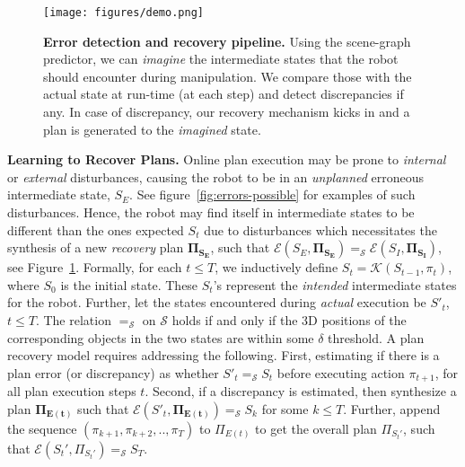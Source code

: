 \begin{figure}
         \centering     \texttt{[image: figures/demo.png]}
    \caption{
            \textbf{Error detection and recovery pipeline.}
             Using the scene-graph predictor, we can \textit{imagine} the intermediate states that the robot should encounter during manipulation. We compare those with the actual state at run-time (at each step) and detect discrepancies if any. In case of discrepancy, our recovery mechanism kicks in and a plan is generated to the \textit{imagined} state. 
    }
    \label{fig:rollout}
\end{figure}

\textbf{Learning to Recover Plans. }
%
Online plan execution may be prone to \emph{internal} or \emph{external} disturbances, causing the robot to be in an \emph{unplanned} erroneous intermediate state, $S_E$. See figure~\ref{fig:errors-possible} for examples of such disturbances.  Hence, the robot may find itself in intermediate states to be different than the ones expected $S_t$ due to disturbances which necessitates the synthesis of a new \emph{recovery} plan $\mathbf{\Pi_{S_E}}$, such that $\mathcal{E}(S_E, \mathbf{\Pi_{S_E}}) =_\mathcal{S} \mathcal{E}(S_I, \mathbf{\Pi_{S_I}})$, see Figure~\ref{fig:rollout}.
%
Formally, for each $t \leq T$, we inductively define $S_t = \mathcal{K}(S_{t - 1}, \pi_t)$, where $S_0$ is the initial state. These $S_t$'s represent the \emph{intended} intermediate states for the robot. Further, let the states encountered during \emph{actual} execution be $S'_t$, $t \leq T$. 
%
The relation $=_\mathcal{S}$ on $\mathcal{S}$ holds if and only if the 3D positions of the corresponding objects in the two states are within some $\delta$ threshold. 
%
A plan recovery model requires addressing the following. First, estimating if there is a plan error (or discrepancy) as whether $S'_t =_\mathcal{S} S_t$ before executing action $\pi_{t + 1}$, for all plan execution steps $t$. 
%
Second, if a discrepancy is estimated, then synthesize a plan $\mathbf{\Pi_{E(t)}}$ such that $\mathcal{E}(S'_t, \mathbf{\Pi_{E(t)}}) =_\mathcal{S} S_k$ for some $k \leq T$.
%
Further, append the sequence $(\pi_{k + 1}, \pi_{k + 2}, .., \pi_T)$ to $\Pi_{E(t)}$ to get the overall plan $\Pi_{S_t'}$, such that $\mathcal{E}(S_t', \Pi_{S_t'}) =_\mathcal{S} S_T$. 
